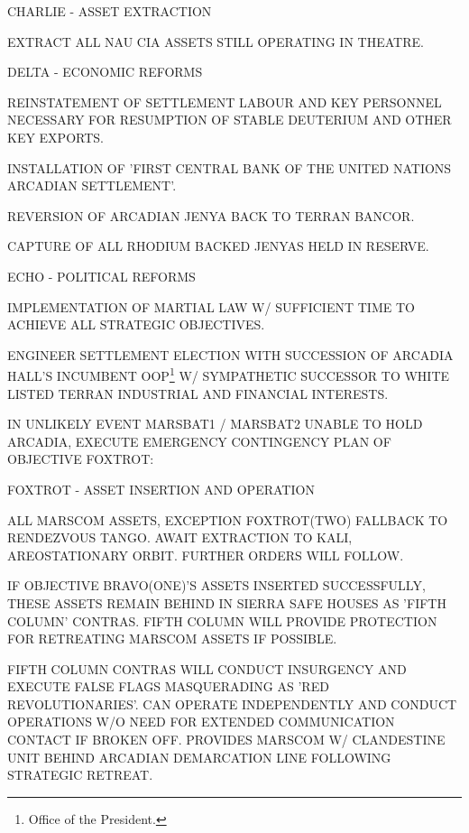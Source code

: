 \item { CHARLIE} - ASSET EXTRACTION
    \startitemize[n]
    \item EXTRACT ALL NAU CIA ASSETS STILL OPERATING IN THEATRE.
    \stopitemize

\item { DELTA} - ECONOMIC REFORMS
    \startitemize[n]
    \item REINSTATEMENT OF SETTLEMENT LABOUR AND KEY PERSONNEL NECESSARY FOR RESUMPTION OF STABLE DEUTERIUM AND OTHER KEY EXPORTS.
    \item INSTALLATION OF 'FIRST CENTRAL BANK OF THE UNITED NATIONS ARCADIAN SETTLEMENT'.
    \item REVERSION OF ARCADIAN JENYA BACK TO TERRAN BANCOR.
    \item CAPTURE OF ALL RHODIUM BACKED JENYAS HELD IN RESERVE.
    \stopitemize

\item { ECHO} - POLITICAL REFORMS
    \startitemize[n]
    \item IMPLEMENTATION OF MARTIAL LAW W/ SUFFICIENT TIME TO ACHIEVE ALL STRATEGIC OBJECTIVES.
    \item ENGINEER SETTLEMENT ELECTION WITH SUCCESSION OF ARCADIA HALL'S INCUMBENT OOP\footnote{Office of the President.} W/ SYMPATHETIC SUCCESSOR TO WHITE LISTED TERRAN INDUSTRIAL AND FINANCIAL INTERESTS.
    \stopitemize
\stopitemize

IN UNLIKELY EVENT MARSBAT1 / MARSBAT2 UNABLE TO HOLD ARCADIA, EXECUTE EMERGENCY CONTINGENCY PLAN OF OBJECTIVE FOXTROT:
\startitemize[1]
\item { FOXTROT} - ASSET INSERTION AND OPERATION

    \startitemize[n]
    \item ALL MARSCOM ASSETS, EXCEPTION FOXTROT(TWO) FALLBACK TO RENDEZVOUS TANGO. AWAIT EXTRACTION TO KALI, AREOSTATIONARY ORBIT. FURTHER ORDERS WILL FOLLOW.

    \item IF OBJECTIVE BRAVO(ONE)'S ASSETS INSERTED SUCCESSFULLY, THESE ASSETS REMAIN BEHIND IN SIERRA SAFE HOUSES AS 'FIFTH COLUMN' CONTRAS. FIFTH COLUMN WILL PROVIDE PROTECTION FOR RETREATING MARSCOM ASSETS IF POSSIBLE.

    \item FIFTH COLUMN CONTRAS WILL CONDUCT INSURGENCY AND EXECUTE FALSE FLAGS MASQUERADING AS 'RED REVOLUTIONARIES'. CAN OPERATE INDEPENDENTLY AND CONDUCT OPERATIONS W/O NEED FOR EXTENDED COMMUNICATION CONTACT IF BROKEN OFF. PROVIDES MARSCOM W/ CLANDESTINE UNIT BEHIND ARCADIAN DEMARCATION LINE FOLLOWING STRATEGIC RETREAT.

